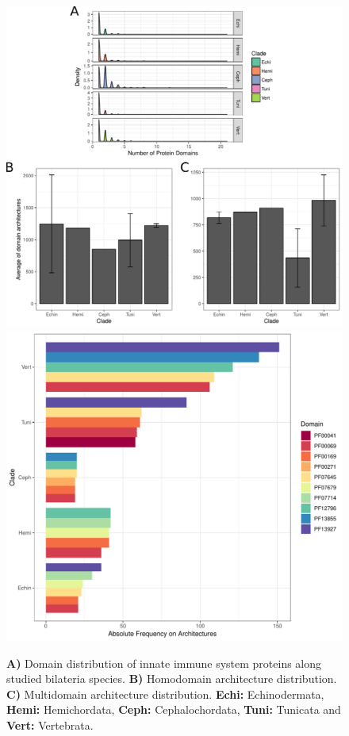\documentclass[11pt]{article}
\begin{document}
\begin{figure}[ht!]
\centering
\includegraphics[scale=0.53]{figures/completeDistributionDomains} \\
\includegraphics[scale=0.38]{figures/heterodomains_distr}
\caption{\textbf{A)} Domain distribution of innate immune system proteins along 
studied 
bilateria species. \textbf{B)} Homodomain architecture distribution. 
\textbf{C)} Multidomain architecture distribution. \textbf{Echi:} 
Echinodermata, \textbf{Hemi:} Hemichordata, \textbf{Ceph:} Cephalochordata, 
\textbf{Tuni:} Tunicata and \textbf{Vert:} Vertebrata.}
\label{fig:domainDistr}
\end{figure}
\end{document}
